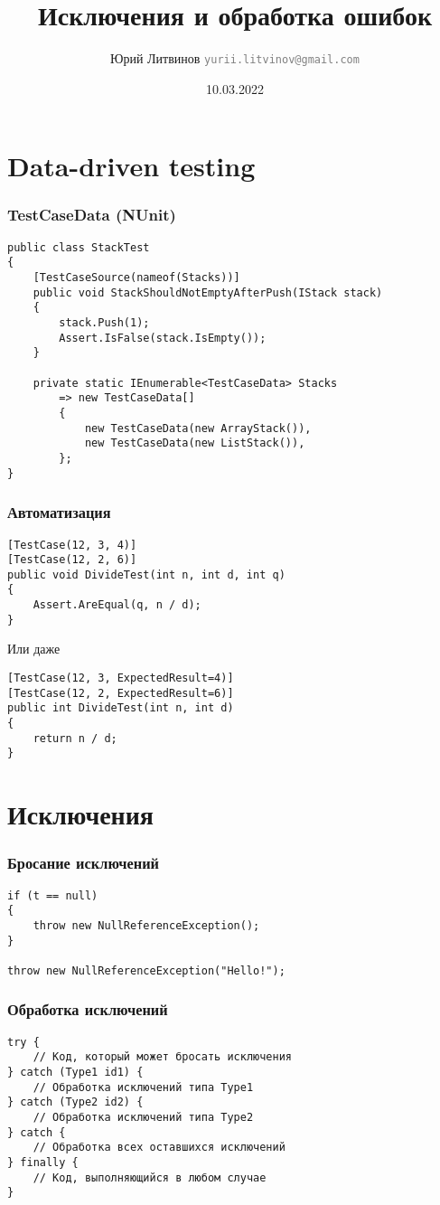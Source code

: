 \documentclass[xetex,mathserif,serif]{beamer}
\title{Исключения и обработка ошибок}
\author[Юрий Литвинов]{Юрий Литвинов \newline \textcolor{gray}{\small\texttt{yurii.litvinov@gmail.com}}}
\date{10.03.2022}
\begin{document}
    
    \frame{\titlepage}

    \section{Data-driven testing}

    \begin{frame}[fragile]
        \frametitle{TestCaseData (NUnit)}
        \begin{verbatim}
public class StackTest
{
    [TestCaseSource(nameof(Stacks))]
    public void StackShouldNotEmptyAfterPush(IStack stack)
    {
        stack.Push(1);
        Assert.IsFalse(stack.IsEmpty());
    }

    private static IEnumerable<TestCaseData> Stacks
        => new TestCaseData[]
        {
            new TestCaseData(new ArrayStack()),
            new TestCaseData(new ListStack()),
        };
}
        \end{verbatim}
    \end{frame}

    \begin{frame}[fragile]
        \frametitle{Автоматизация}
        \begin{verbatim}
[TestCase(12, 3, 4)]
[TestCase(12, 2, 6)]
public void DivideTest(int n, int d, int q)
{
    Assert.AreEqual(q, n / d);
}
        \end{verbatim}
        \vspace{3mm}
        Или даже
        \begin{verbatim}
[TestCase(12, 3, ExpectedResult=4)]
[TestCase(12, 2, ExpectedResult=6)]
public int DivideTest(int n, int d)
{
    return n / d;
}
        \end{verbatim}
    \end{frame}

    \section{Исключения}

    \begin{frame}[fragile]
        \frametitle{Бросание исключений}
        \begin{verbatim}
if (t == null)
{
    throw new NullReferenceException();
}

throw new NullReferenceException("Hello!");
        \end{verbatim}
    \end{frame}

    \begin{frame}[fragile]
        \frametitle{Обработка исключений}
        \begin{verbatim}
try {
    // Код, который может бросать исключения
} catch (Type1 id1) {
    // Обработка исключений типа Type1
} catch (Type2 id2) {
    // Обработка исключений типа Type2
} catch {
    // Обработка всех оставшихся исключений
} finally {
    // Код, выполняющийся в любом случае
}
        \end{verbatim}
    \end{frame}
\end{document}
